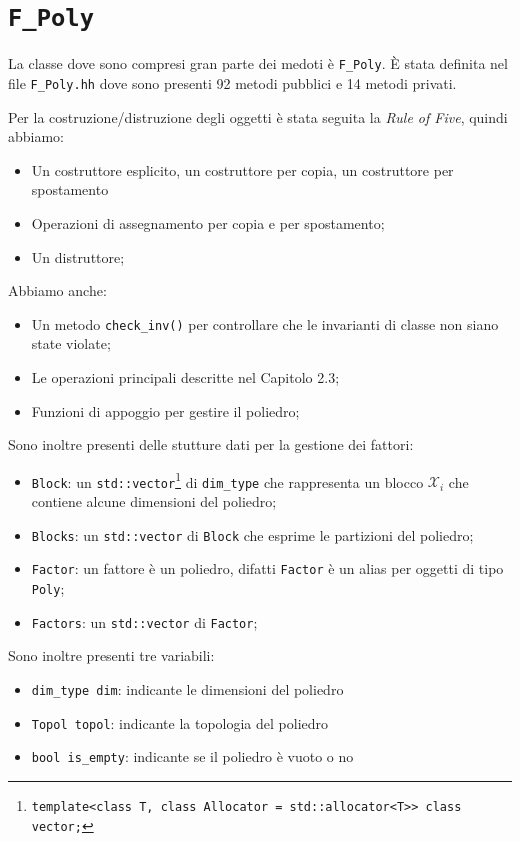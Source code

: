 \documentclass{mimosis}
\theoremstyle{definition}
\begin{document}
\section{\texttt{F\_Poly}}
\label{sec:org3e1a123}
La classe dove sono compresi gran parte dei medoti è \texttt{F\_Poly}. È stata
definita nel file \texttt{F\_Poly.hh} dove sono presenti 92 metodi pubblici e 14 metodi
privati.

Per la costruzione/distruzione degli oggetti è stata seguita la
\emph{Rule of Five}, quindi abbiamo:

\begin{itemize}
\item Un costruttore esplicito, un costruttore per copia, un costruttore per spostamento
\item Operazioni di assegnamento per copia e per spostamento;
\item Un distruttore;
\end{itemize}

Abbiamo anche:

\begin{itemize}
\item Un metodo \texttt{check\_inv()} per controllare che le invarianti di classe non siano
state violate;
\item Le operazioni principali descritte nel Capitolo 2.3;
\item Funzioni di appoggio per gestire il poliedro;
\end{itemize}

Sono inoltre presenti delle stutture dati per la gestione dei fattori:

\begin{itemize}
\item \texttt{Block}: un \texttt{std::vector}\footnote{\texttt{template<class T, class Allocator = std::allocator<T>> class vector;}} di \texttt{dim\_type} che rappresenta un blocco \(\mathcal{X}_i\) che
contiene alcune dimensioni del poliedro;
\item \texttt{Blocks}: un \texttt{std::vector} di \texttt{Block} che esprime le partizioni del poliedro;
\item \texttt{Factor}: un fattore è un poliedro, difatti \texttt{Factor} è un alias per oggetti di tipo \texttt{Poly};
\item \texttt{Factors}: un \texttt{std::vector} di \texttt{Factor};
\end{itemize}

Sono inoltre presenti tre variabili:

\begin{itemize}
\item \texttt{dim\_type dim}: indicante le dimensioni del poliedro
\item \texttt{Topol topol}: indicante la topologia del poliedro
\item \texttt{bool is\_empty}: indicante se il poliedro è vuoto o no
\end{itemize}
\end{document}
